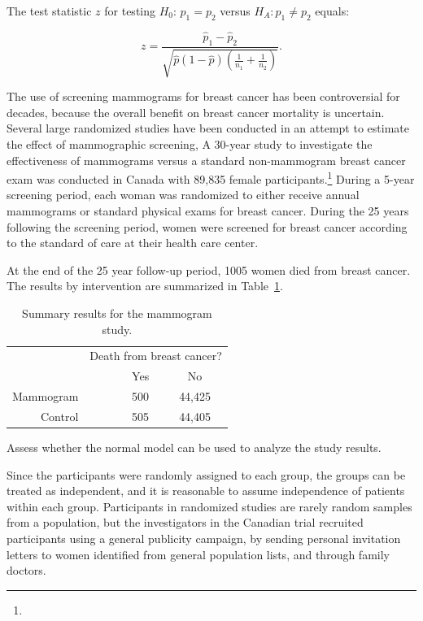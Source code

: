 The test statistic $z$ for testing $H_0:\, p_1 = p_2$ versus $H_A: p_1 \neq p_2$ equals:

\[z = \dfrac{\hat{p}_1 - \hat{p}_2}{\sqrt{\hat{p}(1-\hat{p})\left(\frac{1}{n_1} + \frac{1}{n_2} \right)}}. \]
 

\begin{example}{The use of screening mammograms for breast cancer has been controversial for decades, because the overall benefit on breast cancer mortality is uncertain.  Several large randomized studies have been conducted in an attempt to estimate the effect of mammographic screening,  A 30-year study to investigate the effectiveness of mammograms versus a standard non-mammogram breast cancer exam was conducted in Canada with 89,835 female participants.\footnote{} During a 5-year screening period, each woman was randomized to either receive annual mammograms or standard physical exams for breast cancer.  During the 25 years following the screening period, women were screened for breast cancer according to the standard of care at their health care center. 

At the end of the 25 year follow-up period, 1005 women died from breast cancer. The results by intervention are summarized in Table~\ref{mammogramStudySummaryTable}.
		
\begin{table}[h]
	\centering
	\begin{tabular}{rrcc}
		& \multicolumn{3}{c}{Death from breast cancer?} \\
		\cline{2-4}
		& \ \hspace{3mm}\ & Yes & No \\
		\hline
		Mammogram && 500 & 44,425 \\
		Control && 505 & 44,405 \\
		\hline
	\end{tabular}
	\caption{Summary results for the mammogram study.}
	\label{mammogramStudySummaryTable}
\end{table}

Assess whether the normal model can be used to analyze the study results.}

Since the participants were randomly assigned to each group, the groups can be treated as independent, and it is reasonable to assume independence of patients within each group.  Participants in randomized studies are rarely random samples from a population, but the investigators in the Canadian trial recruited  participants using a general publicity campaign, by sending personal invitation letters to women identified from general population lists, and through family doctors.



\end{example}
